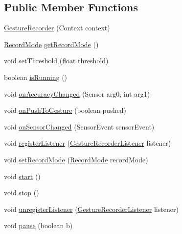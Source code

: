 \subsection*{Public Member Functions}
\begin{DoxyCompactItemize}
\item 
\hyperlink{classde_1_1dfki_1_1ccaal_1_1gestures_1_1recorder_1_1_gesture_recorder_a991281020464a3b55e41e5950d9e07bc}{Gesture\-Recorder} (Context context)
\item 
\hyperlink{enumde_1_1dfki_1_1ccaal_1_1gestures_1_1recorder_1_1_gesture_recorder_1_1_record_mode}{Record\-Mode} \hyperlink{classde_1_1dfki_1_1ccaal_1_1gestures_1_1recorder_1_1_gesture_recorder_a62604901f3d2a3a2c43a20542de695b7}{get\-Record\-Mode} ()
\item 
void \hyperlink{classde_1_1dfki_1_1ccaal_1_1gestures_1_1recorder_1_1_gesture_recorder_a187e60d00d3a879796053346f246e041}{set\-Threshold} (float threshold)
\item 
boolean \hyperlink{classde_1_1dfki_1_1ccaal_1_1gestures_1_1recorder_1_1_gesture_recorder_a7c47374f8ea2cb207f0fe5638b3de05c}{is\-Running} ()
\item 
void \hyperlink{classde_1_1dfki_1_1ccaal_1_1gestures_1_1recorder_1_1_gesture_recorder_a752e1a626a43f9ae0049f58c71b81d01}{on\-Accuracy\-Changed} (Sensor arg0, int arg1)
\item 
void \hyperlink{classde_1_1dfki_1_1ccaal_1_1gestures_1_1recorder_1_1_gesture_recorder_af9e27bf86f1373ea04c3d3a0e2b3758c}{on\-Push\-To\-Gesture} (boolean pushed)
\item 
void \hyperlink{classde_1_1dfki_1_1ccaal_1_1gestures_1_1recorder_1_1_gesture_recorder_aed7edfa4c1cf6e672ca1a003c725cf20}{on\-Sensor\-Changed} (Sensor\-Event sensor\-Event)
\item 
void \hyperlink{classde_1_1dfki_1_1ccaal_1_1gestures_1_1recorder_1_1_gesture_recorder_a8ef9b8dcdee226c619dfaddf6a286b19}{register\-Listener} (\hyperlink{interfacede_1_1dfki_1_1ccaal_1_1gestures_1_1recorder_1_1_gesture_recorder_listener}{Gesture\-Recorder\-Listener} listener)
\item 
void \hyperlink{classde_1_1dfki_1_1ccaal_1_1gestures_1_1recorder_1_1_gesture_recorder_a344cf951361617a46c4664e25003b7ae}{set\-Record\-Mode} (\hyperlink{enumde_1_1dfki_1_1ccaal_1_1gestures_1_1recorder_1_1_gesture_recorder_1_1_record_mode}{Record\-Mode} record\-Mode)
\item 
void \hyperlink{classde_1_1dfki_1_1ccaal_1_1gestures_1_1recorder_1_1_gesture_recorder_a605971da6e88378642988821583d23b9}{start} ()
\item 
void \hyperlink{classde_1_1dfki_1_1ccaal_1_1gestures_1_1recorder_1_1_gesture_recorder_ad8d68e5c8f259eaab3146bcba75ca1f9}{stop} ()
\item 
void \hyperlink{classde_1_1dfki_1_1ccaal_1_1gestures_1_1recorder_1_1_gesture_recorder_a9f13d73493b4aac7373108bff7b2a4e3}{unregister\-Listener} (\hyperlink{interfacede_1_1dfki_1_1ccaal_1_1gestures_1_1recorder_1_1_gesture_recorder_listener}{Gesture\-Recorder\-Listener} listener)
\item 
void \hyperlink{classde_1_1dfki_1_1ccaal_1_1gestures_1_1recorder_1_1_gesture_recorder_a7dbd7a103f70dceb0514c572c64a91f0}{pause} (boolean b)
\end{DoxyCompactItemize}
